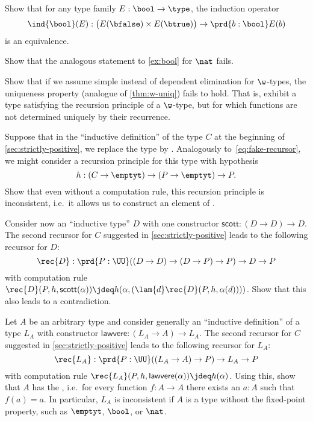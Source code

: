 \begin{ex}\label{ex:bool}
  Show that for any type family $E : \bool \to \type$, the induction operator
  \[ \ind{\bool}(E) : \big(E(\bfalse) \times E(\btrue)\big) \to \prd{b : \bool} E(b) \]
  is an equivalence.
\end{ex}

\begin{ex}\label{ex:ind-nat-not-equiv}
  Show that the analogous statement to \cref{ex:bool} for $\nat$ fails.
\end{ex}

\begin{ex}\label{ex:no-dep-uniqueness-failure}
  Show that if we assume simple instead of dependent elimination for $\w$-types, the uniqueness property (analogue of \cref{thm:w-uniq}) fails to hold.
  That is, exhibit a type satisfying the recursion principle of a $\w$-type, but for which functions are not determined uniquely by their recurrence.
\end{ex}

\begin{ex}\label{ex:loop}
  Suppose that in the ``inductive definition'' of the type $C$ at the beginning of \cref{sec:strictly-positive}, we replace the type \nat by \emptyt.
  Analogously to~\eqref{eq:fake-recursor}, we might consider a recursion principle for this type with hypothesis
  \[ h:(C\to\emptyt) \to (P\to\emptyt) \to P. \]
  Show that even without a computation rule, this recursion principle is inconsistent, i.e.\ it allows us to construct an element of \emptyt.
\end{ex}

\begin{ex}\label{ex:loop2}
  Consider now an ``inductive type'' $D$ with one constructor $\mathsf{scott}:(D\to D) \to D$.
  The second recursor for $C$ suggested in \cref{sec:strictly-positive} leads to the following recursor for $D$:
  \[ \rec{D} : \prd{P:\UU} ((D\to D) \to (D\to P)\to P) \to D \to P \]
  with computation rule $\rec{D}(P,h,\mathsf{scott}(\alpha)) \jdeq h(\alpha,(\lam{d} \rec{D}(P,h,\alpha(d))))$.
  Show that this also leads to a contradiction.
\end{ex}

\begin{ex}\label{ex:inductive-lawvere}
  Let $A$ be an arbitrary type and consider generally an ``inductive definition'' of a type $L_A$ with constructor $\mathsf{lawvere}:(L_A\to A) \to L_A$.
  The second recursor for $C$ suggested in \cref{sec:strictly-positive} leads to the following recursor for $L_A$:
  \[ \rec{L_A} : \prd{P:\UU} ((L_A\to A) \to P) \to L_A\to P \]
  with computation rule $\rec{L_A}(P,h,\mathsf{lawvere}(\alpha)) \jdeq h(\alpha)$.
  Using this, show that $A$ has the , i.e.\ for every function $f:A\to A$ there exists an $a:A$ such that $f(a)=a$.
  In particular, $L_A$ is inconsistent if $A$ is a type without the fixed-point property, such as $\emptyt$, $\bool$, or $\nat$.
\end{ex}

